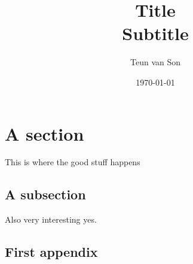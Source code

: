 \documentclass[UKenglish]{article}
\author{Teun van Son}
\title{\textbf{Title}\\Subtitle}
\date{\today}
\begin{document}
\maketitle

\pagebreak

{ 
\hypersetup{linkcolor=black} %
\tableofcontents
}

\pagebreak

\section{A section}
This is where the good stuff happens

\subsection{A subsection}
Also very interesting yes.

\printbibliography



\pagebreak


\begin{refsection}

\appendix

\section{First appendix}

\printbibliography[heading=subbibliography]

\end{refsection}
\end{document}
